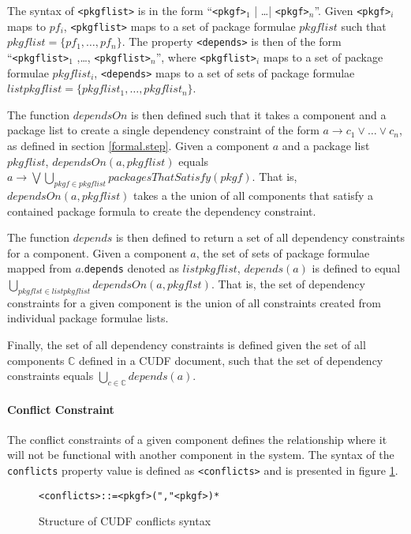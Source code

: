 The syntax of \verb+<pkgflist>+ is in the form ``\verb+<pkgf>+$_1$ | \ldots | \verb+<pkgf>+$_n$''.
Given \verb+<pkgf>+$_i$ maps to $pf_i$, \verb+<pkgflist>+ maps to a set of package formulae $pkgflist$ such that $pkgflist = \{pf_1,\ldots, pf_n\}$.
The property \verb+<depends>+ is then of the form ``\verb+<pkgflist>+$_1$ ,\ldots, \verb+<pkgflist>+$_n$'',
where \verb+<pkgflist>+$_i$ maps to a set of package formulae $pkgflist_i$, \verb+<depends>+ maps to a set of sets of package formulae $listpkgflist = \{pkgflist_1,\ldots,pkgflist_n\}$.

The function $dependsOn$ is then defined such that it takes a component and a package list to create a single dependency constraint of the form $a \rightarrow c_1 \vee \ldots \vee c_n$,
as defined in section \ref{formal.step}.
Given a component $a$ and a package list $pkgflist$, 
$dependsOn(a,pkgflist)$ equals $a \rightarrow \bigvee  \bigcup \limits_{pkgf \in pkgflist} packagesThatSatisfy(pkgf)$.
That is, $dependsOn(a,pkgflist)$ takes a the union of all components that satisfy a contained package formula to create the dependency constraint. 

The function $depends$ is then defined to return a set of all dependency constraints for a component.
Given a component $a$, the set of sets of package formulae mapped from $a$.\verb+depends+ denoted as $listpkgflist$,
$depends(a)$ is defined to equal $\bigcup \limits_{pkgflst \in listpkgflist} dependsOn(a,pkgflst)$.
That is, the set of dependency constraints for a given component is the union of all constraints created from individual package formulae lists.

Finally, the set of all dependency constraints is defined given the set of all components $\mathbb{C}$ defined in a CUDF document,
such that the set of dependency constraints equals $\bigcup \limits_{c\in \mathbb{C}} depends(a)$.

\paragraph{Conflict Constraint}
The conflict constraints of a given component defines the relationship where it will not be functional with another component in the system.
The syntax of the \verb+conflicts+ property value is defined as \verb+<conflicts>+ and is presented in figure \ref{formal.cudfconflictsyntax}.

\begin{figure}[htp] 
\begin{center}
\begin{alltt}
<conflicts> ::= <pkgf> ("," <pkgf>)*
\end{alltt}
  \caption[CUDF Package conflicts syntax]{Structure of CUDF conflicts syntax}
  \label{formal.cudfconflictsyntax}
\end{center}
\end{figure}

